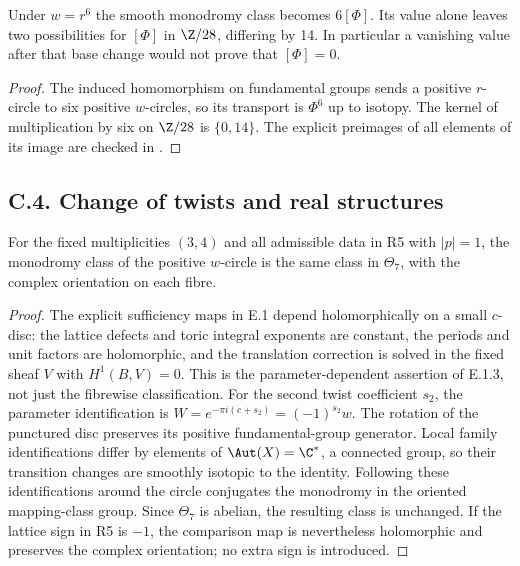 \begin{proposition}
Under $w=r^6$ the smooth monodromy class becomes $6[\Phi]$.
Its value alone leaves two possibilities for $[\Phi]$ in $\Z/28$,
differing by 14. In particular a vanishing value after that base
change would not prove that $[\Phi]=0$.
\end{proposition}
\begin{proof}
The induced homomorphism on fundamental groups sends a positive
$r$-circle to six positive $w$-circles, so its transport is
$\Phi^6$ up to isotopy. The kernel of multiplication by six on
$\Z/28$ is $\{0,14\}$. The explicit preimages of all elements
of its image are checked in .
\end{proof}




\subsection{C.4. Change of twists and real structures}

\begin{proposition}
For the fixed multiplicities $(3,4)$ and all admissible data in R5
with $|p|=1$, the monodromy class of the positive $w$-circle is the
same class in $\Theta_7$, with the complex orientation on each fibre.
\end{proposition}

\begin{proof}
The explicit sufficiency maps in E.1 depend holomorphically on a
small $c$-disc: the lattice defects and toric integral exponents are
constant, the periods and unit factors are holomorphic, and the
translation correction is solved in the fixed sheaf $V$ with
$H^1(B,V)=0$. This is the parameter-dependent assertion of E.1.3,
not just the fibrewise classification. For the second twist
coefficient $s_2$, the parameter identification is
$W=e^{-\pi i(c+s_2)}=(-1)^{s_2}w$.
The rotation of the punctured disc preserves its positive
fundamental-group generator. Local family identifications differ
by elements of $\Aut(X)=\C^*$, a connected group, so their
transition changes are smoothly isotopic to the identity. Following
these identifications around the circle conjugates the monodromy
in the oriented mapping-class group. Since $\Theta_7$ is abelian,
the resulting class is unchanged. If the lattice sign in R5 is
$-1$, the comparison map is nevertheless holomorphic and preserves
the complex orientation; no extra sign is introduced.
\end{proof}

